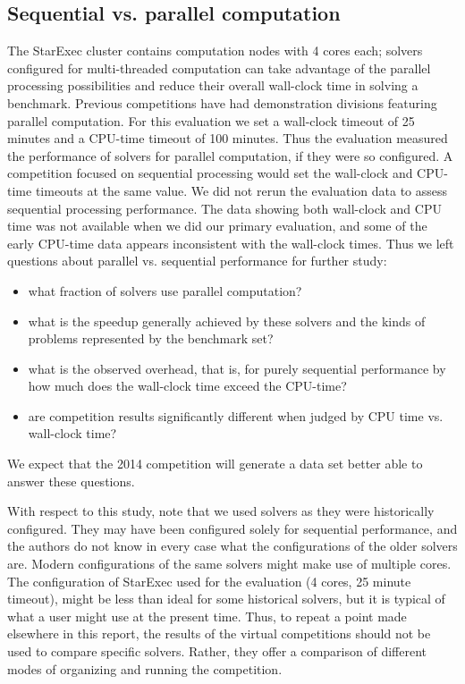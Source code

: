 \documentclass[smallcondensed]{svjour3}
\begin{document}
\subsection{Sequential vs. parallel computation}
\label{parallel}

The StarExec cluster contains computation nodes with 4 cores each; solvers configured for multi-threaded computation can take advantage of the parallel processing possibilities and reduce their overall wall-clock time in solving a benchmark. Previous competitions have had demonstration divisions featuring parallel computation.
For this evaluation we set a wall-clock timeout of 25 minutes and a CPU-time timeout of 100 minutes. Thus the evaluation measured the performance of solvers for parallel computation, if they were so configured. A competition focused on sequential processing would set the wall-clock and CPU-time timeouts at the same value.
We did not rerun the evaluation data to assess sequential processing performance. The data showing both wall-clock and CPU time was not available when we did our 
primary evaluation, and some of the early CPU-time data appears inconsistent with the wall-clock times. Thus we left questions about parallel vs. sequential performance for further study: 
\begin{itemize}
\item what fraction of solvers use parallel computation?
\item what is the speedup generally achieved by these solvers and the kinds of problems represented by the benchmark set?
\item what is the observed overhead, that is, for purely sequential performance by how much does the wall-clock time exceed the CPU-time?
\item are competition results significantly different when judged by CPU time vs. wall-clock time?
\end{itemize}
We expect that the 2014 competition will generate a data set better able to answer these questions.

With respect to this study, note that we used solvers as they were historically configured. They may have been configured solely for sequential performance, and the authors do not know in every case what the configurations of the older solvers are. Modern configurations of the same solvers might make use of multiple cores. The configuration of StarExec used for the evaluation (4 cores, 25 minute timeout), might be less than ideal for some historical solvers, but it is typical of what a user might use at the present time. Thus, to repeat a point made elsewhere in this report, the results of the virtual competitions should not be used to compare specific solvers. Rather, they offer a comparison of different modes of organizing and running the competition.
\end{document}
